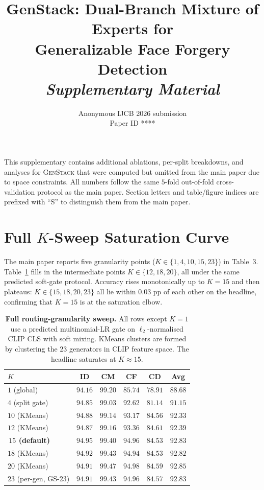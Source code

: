 \documentclass[10pt,twocolumn,letterpaper]{article}
\title{GenStack: Dual-Branch Mixture of Experts for\\Generalizable Face Forgery Detection\\[4pt]\Large\emph{Supplementary Material}}
\author{Anonymous IJCB 2026 submission\\Paper ID ****}
\date{}
\begin{document}
\maketitle
\thispagestyle{empty}
\linenumbers

\noindent This supplementary contains additional ablations, per-split
breakdowns, and analyses for \textsc{GenStack} that were computed but
omitted from the main paper due to space constraints. All numbers
follow the same $5$-fold out-of-fold cross-validation protocol as the
main paper. Section letters and table/figure indices are prefixed with
``S'' to distinguish them from the main paper.

\section{Full $K$-Sweep Saturation Curve}
\label{sec:K_sweep}

The main paper reports five granularity points ($K\!\in\!\{1,4,10,15,23\}$) in Table~3. Table~\ref{tab:K_sweep_full} fills in the intermediate points $K\!\in\!\{12,18,20\}$, all under the same predicted soft-gate protocol. Accuracy rises monotonically up to $K{=}15$ and then plateaus: $K\!\in\!\{15,18,20,23\}$ all lie within $0.03$ pp of each other on the headline, confirming that $K{=}15$ is at the saturation elbow.

\begin{table}[t]
\centering
\footnotesize
\setlength{\tabcolsep}{4pt}
\caption{\textbf{Full routing-granularity sweep.} All rows except $K{=}1$ use a predicted multinomial-LR gate on $\ell_2$-normalised CLIP CLS with soft mixing. KMeans clusters are formed by clustering the $23$ generators in CLIP feature space. The headline saturates at $K{\approx}15$.}
\label{tab:K_sweep_full}
\begin{tabular}{l c c c c c}
\toprule
$K$ & ID & CM & CF & CD & Avg \\
\midrule
$1$  (global)        & $94.16$ & $99.20$ & $85.74$ & $78.91$ & $88.68$ \\
$4$  (split gate)    & $94.85$ & $99.03$ & $92.62$ & $81.14$ & $91.15$ \\
$10$ (KMeans)        & $94.88$ & $99.14$ & $93.17$ & $84.56$ & $92.33$ \\
$12$ (KMeans)        & $94.87$ & $99.16$ & $93.36$ & $84.61$ & $92.39$ \\
\,\textbf{$15$ (default)} & $\mathbf{94.95}$ & $99.40$ & $\mathbf{94.96}$ & $84.53$ & $\mathbf{92.83}$ \\
$18$ (KMeans)        & $94.92$ & $99.43$ & $94.94$ & $84.53$ & $92.82$ \\
$20$ (KMeans)        & $94.91$ & $\mathbf{99.47}$ & $\mathbf{94.98}$ & $\mathbf{84.59}$ & $92.85$ \\
$23$ (per-gen, GS-23) & $94.91$ & $99.43$ & $\mathbf{94.96}$ & $84.57$ & $\mathbf{92.83}$ \\
\bottomrule
\end{tabular}
\end{table}
\end{document}
